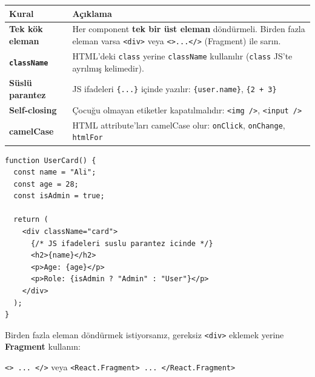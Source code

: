 \documentclass[12pt, a4paper]{article}
\begin{document}
\begin{tcolorbox}[enhanced, colback=lightbg, colframe=gray!30, arc=4pt]
\sffamily\small
\begin{tabularx}{\textwidth}{>{\bfseries\color{primary}}l X}
\toprule
Kural & Açıklama \\
\midrule
Tek kök eleman &
  Her component \textbf{tek bir üst eleman} döndürmeli.
  Birden fazla eleman varsa \texttt{<div>} veya \texttt{<>...</>} (Fragment) ile sarın. \\[4pt]
\texttt{className} &
  HTML'deki \texttt{class} yerine \texttt{className} kullanılır
  (\texttt{class} JS'te ayrılmış kelimedir). \\[4pt]
Süslü parantez &
  JS ifadeleri \texttt{\{...\}} içinde yazılır: \texttt{\{user.name\}}, \texttt{\{2 + 3\}} \\[4pt]
Self-closing &
  Çocuğu olmayan etiketler kapatılmalıdır: \texttt{<img />}, \texttt{<input />} \\[4pt]
camelCase &
  HTML attribute'ları camelCase olur: \texttt{onClick}, \texttt{onChange}, \texttt{htmlFor} \\
\bottomrule
\end{tabularx}
\end{tcolorbox}

\vspace{6pt}

\begin{tcolorbox}[enhanced, colback=codebg, colframe=gray!30,
    colbacktitle=primary!85!black, coltitle=white, arc=4pt,
    title={\sffamily\bfseries\small JSX Örnekleri}]
\begin{lstlisting}[style=jsxstyle]
function UserCard() {
  const name = "Ali";
  const age = 28;
  const isAdmin = true;

  return (
    <div className="card">
      {/* JS ifadeleri suslu parantez icinde */}
      <h2>{name}</h2>
      <p>Age: {age}</p>
      <p>Role: {isAdmin ? "Admin" : "User"}</p>
    </div>
  );
}
\end{lstlisting}
\end{tcolorbox}

\vspace{4pt}

\begin{warningbox}
Birden fazla eleman döndürmek istiyorsanız, gereksiz \texttt{<div>}
eklemek yerine \textbf{Fragment} kullanın:

\vspace{4pt}
\texttt{<> ... </>} \quad veya \quad \texttt{<React.Fragment> ... </React.Fragment>}
\end{warningbox}
\end{document}
